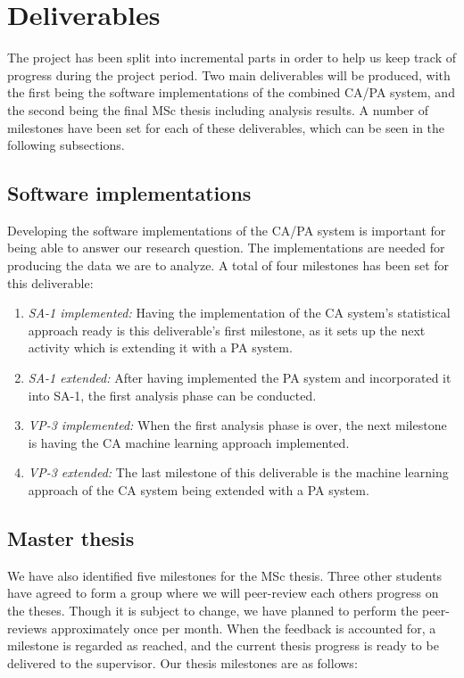 \documentclass[informationsecurity]{gucmasterproject}
\begin{document}
\section{Deliverables}
\label{sec:milestones-deliverables}
The project has been split into incremental parts in order to help us keep track of progress during the project period.
Two main deliverables will be produced, with the first being the software implementations of the combined CA/PA system, and the second being the final MSc thesis including analysis results.
A number of milestones have been set for each of these deliverables, which can be seen in the following subsections.

\subsection{Software implementations}
\label{sec:milestones-deliverables-software}
Developing the software implementations of the CA/PA system is important for being able to answer our research question.
The implementations are needed for producing the data we are to analyze.
A total of four milestones has been set for this deliverable:

\begin{enumerate}
    \item \textit{SA-1 implemented:} Having the implementation of the CA system's statistical approach ready is this deliverable's first milestone, as it sets up the next activity which is extending it with a PA system.
    \item \textit{SA-1 extended:} After having implemented the PA system and incorporated it into SA-1, the first analysis phase can be conducted.
    \item \textit{VP-3 implemented:} When the first analysis phase is over, the next milestone is having the CA machine learning approach implemented.
    \item \textit{VP-3 extended:} The last milestone of this deliverable is the machine learning approach of the CA system being extended with a PA system.
\end{enumerate}

\subsection{Master thesis}
\label{sec:milestones-deliverables-thesis}
We have also identified five milestones for the MSc thesis. 
Three other students have agreed to form a group where we will peer-review each others progress on the theses. 
Though it is subject to change, we have planned to perform the peer-reviews approximately once per month.
When the feedback is accounted for, a milestone is regarded as reached, and the current thesis progress is ready to be delivered to the supervisor.
Our thesis milestones are as follows:
\end{document}
